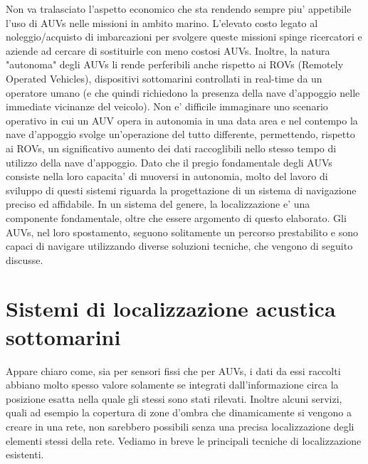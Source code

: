 Non va tralasciato l'aspetto economico che sta rendendo sempre piu' appetibile l'uso di AUVs nelle missioni in ambito marino. L'elevato costo legato al noleggio/acquisto di imbarcazioni per svolgere queste missioni spinge ricercatori e aziende ad cercare di sostituirle con meno costosi AUVs. Inoltre, la natura "autonoma" degli AUVs li rende perferibili anche rispetto ai ROVs (Remotely Operated Vehicles), dispositivi sottomarini controllati in real-time da un operatore umano (e che quindi richiedono la presenza della nave d'appoggio nelle immediate vicinanze del veicolo). Non e' difficile immaginare uno scenario operativo in cui un AUV opera in autonomia in una data area e nel contempo la nave d'appoggio svolge un'operazione del tutto differente, permettendo, rispetto ai ROVs, un significativo aumento dei dati raccoglibili nello stesso tempo di utilizzo della nave d'appoggio. \newline
Dato che il pregio fondamentale degli AUVs consiste nella loro capacita' di muoversi in autonomia, molto del lavoro di sviluppo di questi sistemi riguarda la progettazione di un sistema di navigazione preciso ed affidabile. In un sistema del genere, la localizzazione e' una componente fondamentale, oltre che essere argomento di questo elaborato.
Gli AUVs, nel loro spostamento, seguono solitamente un percorso prestabilito e sono capaci di navigare utilizzando diverse soluzioni tecniche, che vengono di seguito discusse.


\section{Sistemi di localizzazione acustica sottomarini}
Appare chiaro come, sia per sensori fissi che per AUVs, i dati da essi raccolti abbiano molto spesso valore solamente se integrati dall'informazione circa la posizione esatta nella quale gli stessi sono stati rilevati. Inoltre alcuni servizi, quali ad esempio la copertura di zone d'ombra che dinamicamente si vengono a creare in una rete, non sarebbero possibili senza una precisa localizzazione degli elementi stessi della rete.
Vediamo in breve le principali tecniche di localizzazione esistenti.

